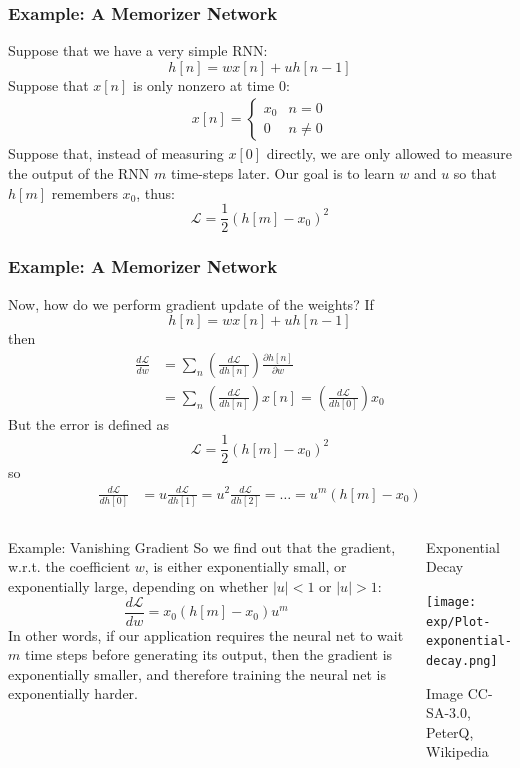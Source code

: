 \documentclass{beamer}
\begin{document}
\begin{frame}
  \frametitle{Example: A Memorizer Network}
  Suppose that we have a very simple RNN:
  \[
  h[n] = w x[n]+uh[n-1]
  \]
  Suppose that $x[n]$ is only nonzero at time $0$:
  \begin{align*}
    x[n]=\begin{cases}x_0&n=0\\0& n\ne 0\end{cases}
  \end{align*}
  Suppose that, instead of measuring $x[0]$ directly, we are only
  allowed to measure the output of the RNN $m$ time-steps later.  Our goal is
  to learn $w$ and $u$ so that $h[m]$ remembers $x_0$, thus:
  \[
  {\mathcal L}=\frac{1}{2}\left(h[m]-x_0\right)^2
  \]
\end{frame}

\begin{frame}
  \frametitle{Example: A Memorizer Network}

  Now, how do we perform gradient update of the weights?  If
  \[
  h[n] = w x[n]+uh[n-1]
  \]
  then
  \begin{align*}
    \frac{d{\mathcal L}}{dw} &= \sum_n \left(\frac{d{\mathcal L}}{dh[n]}\right)\frac{\partial h[n]}{\partial w} \\
   &= \sum_n \left(\frac{d{\mathcal L}}{dh[n]}\right)x[n]
    = \left(\frac{d{\mathcal L}}{dh[0]}\right)x_0
  \end{align*}
  But the error is defined as
  \[
  {\mathcal L}=\frac{1}{2}\left(h[m]-x_0\right)^2
  \]
  so
  \begin{align*}
    \frac{d{\mathcal L}}{dh[0]} &= u\frac{d{\mathcal L}}{dh[1]} = u^2\frac{d{\mathcal L}}{dh[2]} = \ldots
    = u^m \left(h[m]-x_0\right)
  \end{align*}
\end{frame}
  
\begin{frame}
  \begin{columns}
    \column{2.2in}
    \begin{block}{Example: Vanishing Gradient}
      So we find out that the gradient, w.r.t. the coefficient $w$, is
      either exponentially small, or exponentially large, depending on
      whether $|u|<1$ or $|u|>1$:
      \[
      \frac{d{\mathcal L}}{dw} = x_0\left(h[m]-x_0\right) u^m
      \]
      In other words, if our application requires the neural net to
      wait $m$ time steps before generating its output, then the
      gradient is exponentially smaller, and therefore training the
      neural net is exponentially harder.
    \end{block}
    \column{2.5in}
    \begin{block}{Exponential Decay}
      \centerline{\texttt{[image: exp/Plot-exponential-decay.png]}}
      \begin{tiny}Image CC-SA-3.0, PeterQ, Wikipedia\end{tiny}
    \end{block}
    \end{columns}
\end{frame}
\end{document}
